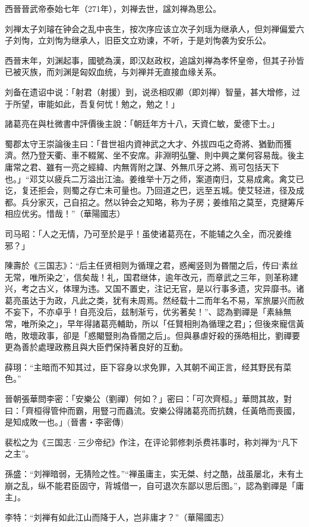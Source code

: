 西晉晉武帝泰始七年（271年），刘禅去世，諡刘禅為思公。

刘禅太子刘璿在钟会之乱中丧生，按次序应该立次子刘瑶为继承人，但刘禅偏爱六子刘恂，立刘恂为继承人，旧臣文立劝谏，不听，于是刘恂袭为安乐公。

西晉末年，刘渊起事，國號為漢，即汉赵政权，追諡刘禅為孝怀皇帝，但其子孙皆已被灭族，而刘渊是匈奴血统，与刘禅并无直接血缘关系。

刘备在遗诏中说：「射君（射援）到，说丞相叹卿（即刘禅）智量，甚大增修，过于所望，审能如此，吾复何忧！勉之，勉之！」

諸葛亮在與杜微書中評價後主說：「朝廷年方十八，天資仁敏，愛德下士。」

蜀郡太守王崇論後主曰：「昔世祖内資神武之大才、外拔四屯之奇將、猶勤而獲濟。然乃登天衢、車不輟駕、坐不安席。非淵明弘鑒、則中興之業何容易哉。後主庸常之君、雖有一亮之經緯、内無胥附之謀、外無爪牙之將、焉可包括天下也。」“邓艾以疲兵二万溢出江油。姜维举十万之师，案道南归，艾易成禽。禽艾已讫，复还拒会，则蜀之存亡未可量也。乃回道之巴，远至五城。使艾轻进，径及成都。兵分家灭，己自招之。然以钟会之知略，称为子房；姜维陷之莫至，克揵筹斥相应优劣。惜哉！”（華陽國志）

司马昭：「人之无情，乃可至於是乎！虽使诸葛亮在，不能辅之久全，而况姜维邪？」

陳壽於《三国志》：“后主任贤相则为循理之君，惑阉竖则为昬闇之后，传曰‘素丝无常，唯所染之’，信矣哉！礼，国君继体，逾年改元，而章武之三年，则革称建兴，考之古义，体理为违。又国不置史，注记无官，是以行事多遗，灾异靡书。诸葛亮虽达于为政，凡此之类，犹有未周焉。然经载十二而年名不易，军旅屡兴而赦不妄下，不亦卓乎！自亮没后，兹制渐亏，优劣著矣！”、認為劉禪是「素絲無常，唯所染之」，早年得諸葛亮輔助，所以「任賢相則為循理之君」；但後來寵信黃皓，敗壞政事，卻是「惑閹豎則為昏闇之后」。但與暴虐好殺的孫皓相比，劉禪要更為善於處理政務且與大臣們保持著良好的互動。

薛珝：“主暗而不知其过，臣下容身以求免罪，入其朝不闻正言，经其野民有菜色。”

晉朝張華問李密：「安樂公（劉禪）何如？」密曰：「可次齊桓。」華問其故，對曰：「齊桓得管仲而霸，用豎刁而蟲流。安樂公得諸葛亮而抗魏，任黃皓而喪國，是知成敗一也。」(晉書‧李密傳)

裴松之为《三国志·三少帝纪》作注，在评论郭修刺杀费祎事时，称刘禅为“凡下之主”。

孫盛：“刘禅暗弱，无猜险之性。”“禅虽庸主，实无桀、纣之酷，战虽屡北，未有土崩之乱，纵不能君臣固守，背城借一，自可退次东鄙以思后图。”，認為劉禪是「庸主」。

李特：“刘禅有如此江山而降于人，岂非庸才？”（華陽國志）

